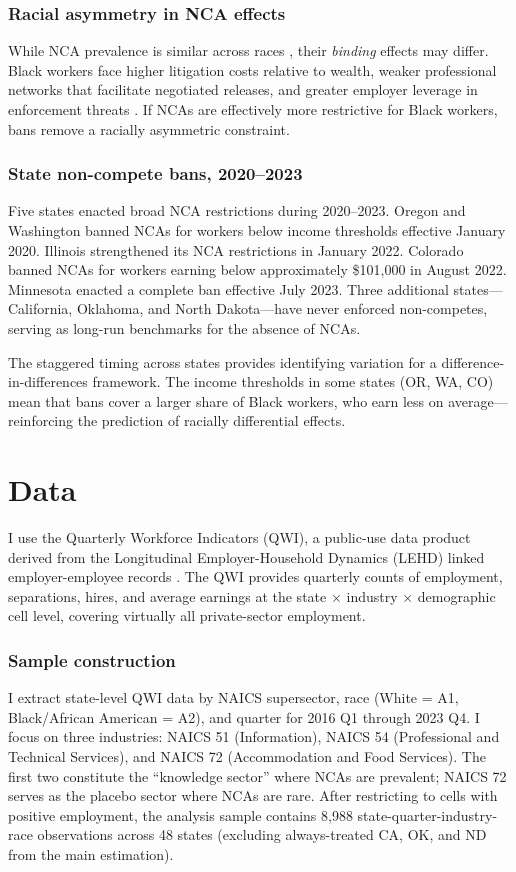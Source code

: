 \documentclass[12pt]{article}
\begin{document}
\subsubsection*{Racial asymmetry in NCA effects} While NCA prevalence is similar across races \citep{prescott2016understanding}, their \emph{binding} effects may differ. Black workers face higher litigation costs relative to wealth, weaker professional networks that facilitate negotiated releases, and greater employer leverage in enforcement threats \citep{butler2023racial}. If NCAs are effectively more restrictive for Black workers, bans remove a racially asymmetric constraint.

\subsubsection*{State non-compete bans, 2020--2023} Five states enacted broad NCA restrictions during 2020--2023. Oregon and Washington banned NCAs for workers below income thresholds effective January 2020. Illinois strengthened its NCA restrictions in January 2022. Colorado banned NCAs for workers earning below approximately \$101,000 in August 2022. Minnesota enacted a complete ban effective July 2023. Three additional states---California, Oklahoma, and North Dakota---have never enforced non-competes, serving as long-run benchmarks for the absence of NCAs.

The staggered timing across states provides identifying variation for a difference-in-differences framework. The income thresholds in some states (OR, WA, CO) mean that bans cover a larger share of Black workers, who earn less on average---reinforcing the prediction of racially differential effects.

\section{Data}

I use the Quarterly Workforce Indicators (QWI), a public-use data product derived from the Longitudinal Employer-Household Dynamics (LEHD) linked employer-employee records \citep{abowd2009confidentiality}. The QWI provides quarterly counts of employment, separations, hires, and average earnings at the state $\times$ industry $\times$ demographic cell level, covering virtually all private-sector employment.

\subsubsection*{Sample construction} I extract state-level QWI data by NAICS supersector, race (White = A1, Black/African American = A2), and quarter for 2016 Q1 through 2023 Q4. I focus on three industries: NAICS 51 (Information), NAICS 54 (Professional and Technical Services), and NAICS 72 (Accommodation and Food Services). The first two constitute the ``knowledge sector'' where NCAs are prevalent; NAICS 72 serves as the placebo sector where NCAs are rare. After restricting to cells with positive employment, the analysis sample contains 8,988 state-quarter-industry-race observations across 48 states (excluding always-treated CA, OK, and ND from the main estimation).
\end{document}
